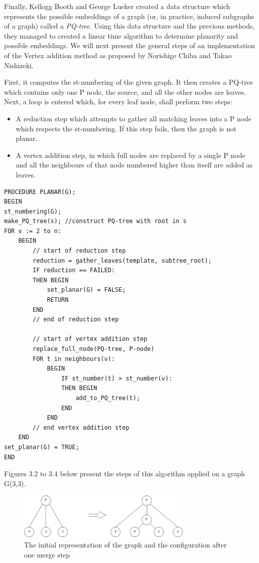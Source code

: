 Finally, Kellogg Booth and George Lueker created a data structure which represents the possible embeddings of a graph 
(or, in practice, induced subgraphs of a graph) called a \emph{PQ-tree}. Using this data structure and the previous methods, 
they managed to created a linear time algorithm to determine planarity and possible embeddings. We will next present 
the general steps of an implementation of the Vertex addition method as proposed by Norishige Chiba and Takao Nishizeki.

First, it computes the st-numbering of the given graph. It then creates a PQ-tree which contains only one P node, the 
source, and all the other nodes are leaves. Next, a loop is entered which, for every leaf node, shall perform two steps:

\begin{itemize}
\item A reduction step which attempts to gather all matching leaves into a P node which respects the st-numbering. If this 
step fails, then the graph is not planar.
\item A vertex addition step, in which full nodes are replaced by a single P node and all the neighbours of that node 
numbered higher than itself are added as leaves.
\end{itemize}

\begin{lstlisting}[caption={Vertex addition algorithm as proposed by Chiba and Nishizieki}]
PROCEDURE PLANAR(G);
BEGIN
st_numbering(G);
make_PQ_tree(s); //construct PQ-tree with root in s
FOR v := 2 to n:
	BEGIN
		// start of reduction step
		reduction = gather_leaves(template, subtree_root);
		IF reduction == FAILED:
		THEN BEGIN
			set_planar(G) = FALSE;
			RETURN
		END
		// end of reduction step
			
		// start of vertex addition step
		replace_full_node(PQ-tree, P-node)
		FOR t in neighbours(v):
			BEGIN
				IF st_number(t) > st_number(v):
				THEN BEGIN
					add_to_PQ_tree(t);
				END
			END
		// end vertex addition step
	END
set_planar(G) = TRUE;
END
\end{lstlisting}



Figures 3.2 to 3.4 below present the steps of this algorithm applied on a graph G(3,3).

\begin{figure}[ht] \centering
\includegraphics[width=0.75\textwidth]{img/algdesing/vertex_reduction_step_1.png}
\caption{The initial representation of the graph and the configuration after one merge step} \end{figure}

